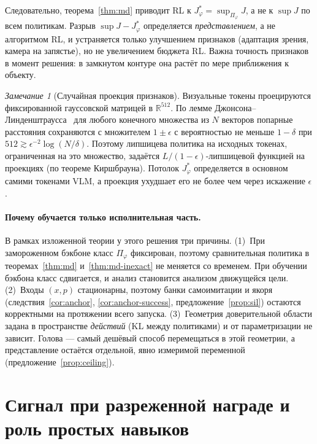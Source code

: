 \documentclass[11pt,a4paper]{article}
\theoremstyle{plain}
\theoremstyle{definition}
\theoremstyle{remark}
\newtheorem{remark}[theorem]{Замечание}
\newcommand{\R}{\mathbb{R}}
\begin{document}
Следовательно, теорема~\ref{thm:md} приводит RL к $J^\ast_\varphi=\sup_{\Pi_\varphi}J$, а не к $\sup J$ по всем политикам. Разрыв $\sup J-J^\ast_\varphi$ определяется \emph{представлением}, а не алгоритмом RL, и устраняется только улучшением признаков (адаптация зрения, камера на запястье), но не увеличением бюджета RL. Важна точность признаков в момент решения: в замкнутом контуре она растёт по мере приближения к объекту.

\begin{remark}[Случайная проекция признаков]\label{rem:jl}
Визуальные токены проецируются фиксированной гауссовской матрицей в $\R^{512}$. По лемме Джонсона--Линденштраусса~\cite{jl,dasgupta} для любого конечного множества из $N$ векторов попарные расстояния сохраняются с множителем $1\pm\epsilon$ с вероятностью не меньше $1-\delta$ при $512\gtrsim\epsilon^{-2}\log(N/\delta)$. Поэтому липшицева политика на исходных токенах, ограниченная на это множество, задаётся $L/(1-\epsilon)$-липшицевой функцией на проекциях (по теореме Киршбрауна). Потолок $J^\ast_\varphi$ определяется в основном самими токенами VLM, а проекция ухудшает его не более чем через искажение $\epsilon$.
\end{remark}

\paragraph{Почему обучается только исполнительная часть.} В рамках изложенной теории у этого решения три причины.
(1)~При замороженном бэкбоне класс $\Pi_\varphi$ фиксирован, поэтому сравнительная политика в теоремах~\ref{thm:md} и~\ref{thm:md-inexact} не меняется со временем. При обучении бэкбона класс сдвигается, и анализ становится анализом движущейся цели.
(2)~Входы $(x,p)$ стационарны, поэтому банки самоимитации и якоря (следствия~\ref{cor:anchor}, \ref{cor:anchor-success}, предложение~\ref{prop:sil}) остаются корректными на протяжении всего запуска.
(3)~Геометрия доверительной области задана в пространстве \emph{действий} (KL между политиками) и от параметризации не зависит. Голова --- самый дешёвый способ перемещаться в этой геометрии, а представление остаётся отдельной, явно измеримой переменной (предложение~\ref{prop:ceiling}).

\section{Сигнал при разреженной награде и роль простых навыков}\label{sec:signal}
\end{document}
